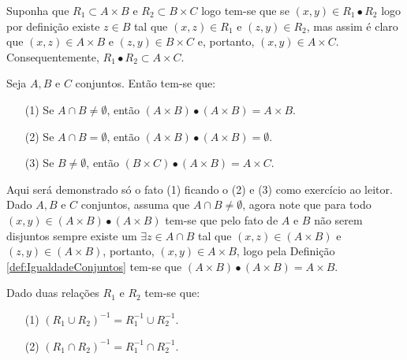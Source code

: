 \begin{prova}
	 Suponha que $R_1 \subset A \times B$ e $R_2 \subset B \times C$ logo tem-se que se $(x, y) \in R_1 \bullet R_2$ logo por definição existe $z \in B$ tal que $(x, z) \in R_1$ e $(z, y) \in R_2$, mas assim é claro que $(x, z) \in A \times B$ e $(z, y) \in B \times C$ e, portanto, $(x, y) \in A \times C$. Consequentemente, $R_1 \bullet R_2 \subset A \times C$.
\end{prova}

\begin{teorema}
	Seja $A, B$ e $C$ conjuntos. Então tem-se que:
	\begin{itemize}
		\item[(1)] Se $A \cap B \neq \emptyset$, então $(A \times B) \bullet (A \times B) = A \times B$.
		\item[(2)] Se $A \cap B = \emptyset$, então $(A \times B) \bullet (A \times B) = \emptyset$.
		\item[(3)] Se $B \neq \emptyset$, então $(B \times C) \bullet (A \times B) = A \times C$.
	\end{itemize}
\end{teorema}

\begin{prova}
	Aqui será demonstrado só o fato (1) ficando o (2) e (3) como exercício ao leitor. Dado $A, B$ e $C$ conjuntos, assuma que $A \cap B \neq \emptyset$, agora note que para todo $(x, y) \in (A \times B) \bullet (A \times B)$ tem-se que pelo fato de $A$ e $B$ não serem disjuntos sempre existe um $\exists z \in A \cap B$ tal que $(x, z) \in (A \times B)$ e $(z, y) \in (A \times B)$, portanto, $(x, y) \in A \times B$, logo pela Definição \ref{def:IgualdadeConjuntos} tem-se que $(A \times B) \bullet (A \times B) = A \times B$.
\end{prova}

\begin{teorema}\label{teo:DistributividadeDaRelacaoInversa}
	Dado duas relações $R_1$ e $R_2$ tem-se que:
	\begin{itemize}
		\item[(1)] $(R_1 \cup R_2)^{-1} = R_1^{-1} \cup R_2^{-1}$.
		\item[(2)] $(R_1 \cap R_2)^{-1} = R_1^{-1} \cap R_2^{-1}$.
	\end{itemize}
\end{teorema}

